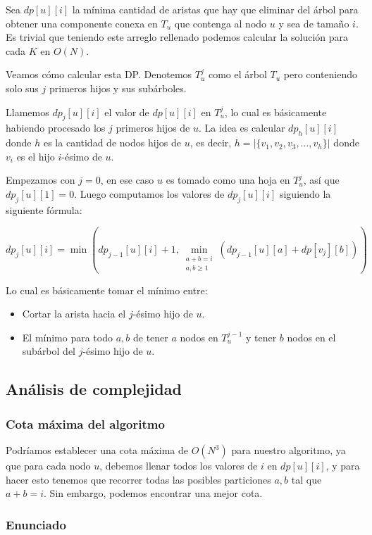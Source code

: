 \documentclass[a4paper, 12pt]{article}
\begin{document}
Sea $dp[u][i]$ la mínima cantidad de aristas que hay que eliminar del árbol para obtener una componente conexa en $T_u$
que contenga al nodo $u$ y sea de tamaño $i$.
Es trivial que teniendo este arreglo rellenado podemos calcular la solución para cada $K$ en $O(N)$.

Veamos cómo calcular esta DP. 
Denotemos $T_u^{j}$ como el árbol $T_u$ pero conteniendo solo sus $j$ primeros hijos y sus subárboles.

Llamemos $dp_j[u][i]$ el valor de $dp[u][i]$ en $T_u^{j}$, lo cual es básicamente habiendo procesado los $j$ primeros hijos de $u$.
La idea es calcular $dp_h[u][i]$ donde $h$ es la cantidad de nodos hijos de $u$, es decir, $h = | \{v_1,v_2,v_3,\dots,v_h\} |$ donde $v_i$ es el hijo $i$-ésimo de $u$.

Empezamos con $j=0$, en ese caso $u$ es tomado como una hoja en $T_u^{j}$, así que $dp_j[u][1] = 0$.
Luego computamos los valores de $dp_j[u][i]$ siguiendo la siguiente fórmula:

\[
dp_j[u][i] = \min \left( dp_{j-1}[u][i] + 1, \min_{\substack{a+b=i \\  a, b \geq 1}} (dp_{j-1}[u][a] + dp[v_j][b]) \right)
\]

Lo cual es básicamente tomar el mínimo entre: 
\begin{itemize}
    \item Cortar la arista hacia el $j$-ésimo hijo de $u$. 
    \item El mínimo para todo $a, b$ de tener $a$ nodos en $T_u^{j-1}$ y tener $b$ nodos en el subárbol del $j$-ésimo hijo de $u$.
\end{itemize}

\subsection{Análisis de complejidad}

\subsubsection{Cota máxima del algoritmo}

Podríamos establecer una cota máxima de $O(N^3)$ para nuestro algoritmo, ya que para cada nodo $u$,
debemos llenar todos los valores de $i$ en $dp[u][i]$, y para hacer esto tenemos que recorrer todas las posibles
particiones $a, b$ tal que $a + b = i$. Sin embargo, podemos encontrar una mejor cota.

\subsubsection{Enunciado}
\end{document}
